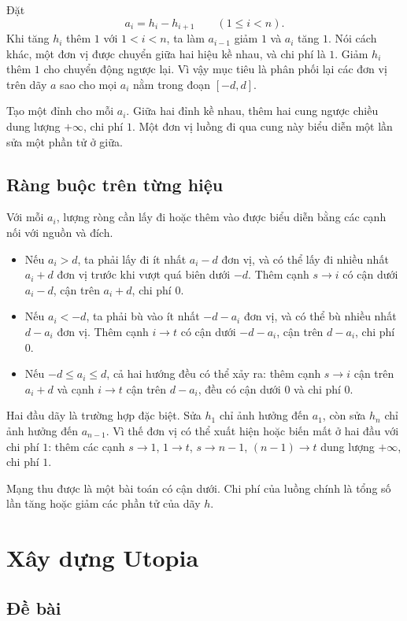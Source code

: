 \documentclass[11pt]{article}
\begin{document}
Đặt
\[
  a_i=h_i-h_{i+1}\qquad (1\le i<n).
\]
Khi tăng $h_i$ thêm $1$ với $1<i<n$, ta làm $a_{i-1}$ giảm $1$ và $a_i$ tăng
$1$. Nói cách khác, một đơn vị được chuyển giữa hai hiệu kề nhau, và chi phí
là $1$. Giảm $h_i$ thêm $1$ cho chuyển động ngược lại. Vì vậy mục tiêu là
phân phối lại các đơn vị trên dãy $a$ sao cho mọi $a_i$ nằm trong đoạn
$[-d,d]$.

Tạo một đỉnh cho mỗi $a_i$. Giữa hai đỉnh kề nhau, thêm hai cung ngược chiều
dung lượng $+\infty$, chi phí $1$. Một đơn vị luồng đi qua cung này biểu diễn
một lần sửa một phần tử ở giữa.

\subsection*{Ràng buộc trên từng hiệu}

Với mỗi $a_i$, lượng ròng cần lấy đi hoặc thêm vào được biểu diễn bằng các
cạnh nối với nguồn và đích.

\begin{itemize}
  \item Nếu $a_i>d$, ta phải lấy đi ít nhất $a_i-d$ đơn vị, và có thể lấy đi
  nhiều nhất $a_i+d$ đơn vị trước khi vượt quá biên dưới $-d$. Thêm cạnh
  $s\to i$ có cận dưới $a_i-d$, cận trên $a_i+d$, chi phí $0$.
  \item Nếu $a_i<-d$, ta phải bù vào ít nhất $-d-a_i$ đơn vị, và có thể bù
  nhiều nhất $d-a_i$ đơn vị. Thêm cạnh $i\to t$ có cận dưới $-d-a_i$, cận trên
  $d-a_i$, chi phí $0$.
  \item Nếu $-d\le a_i\le d$, cả hai hướng đều có thể xảy ra: thêm cạnh
  $s\to i$ cận trên $a_i+d$ và cạnh $i\to t$ cận trên $d-a_i$, đều có cận dưới
  $0$ và chi phí $0$.
\end{itemize}

Hai đầu dãy là trường hợp đặc biệt. Sửa $h_1$ chỉ ảnh hưởng đến $a_1$, còn sửa
$h_n$ chỉ ảnh hưởng đến $a_{n-1}$. Vì thế đơn vị có thể xuất hiện hoặc biến
mất ở hai đầu với chi phí $1$: thêm các cạnh $s\to 1$, $1\to t$,
$s\to n-1$, $(n-1)\to t$ dung lượng $+\infty$, chi phí $1$.

Mạng thu được là một bài toán  có cận
dưới. Chi phí của luồng chính là tổng số lần tăng hoặc giảm các phần tử của
dãy $h$.

\section{Xây dựng Utopia}

\subsection*{Đề bài}
\end{document}
